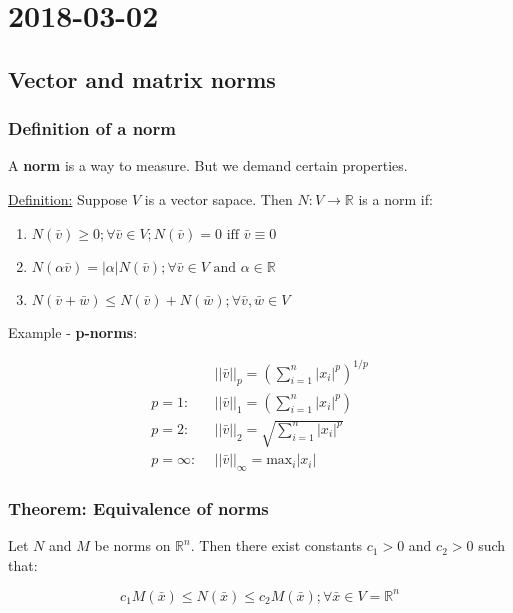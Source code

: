 \section{2018-03-02}

\subsection{Vector and matrix norms}

\subsubsection{Definition of a norm}

A \textbf{norm} is a way to measure. But we demand certain properties.

\underline{Definition:} Suppose $V$ is a vector sapace. Then $N: V \rightarrow \mathbb{R}$ is a norm if:

\begin{enumerate}
  \item $N(\bar{v}) \geq 0; \forall \bar{v} \in V; N(\bar{v}) = 0 \text{ iff } \bar{v} \equiv 0$
  \item $N(\alpha \bar{v}) = |\alpha| N(\bar{v}); \forall \bar{v} \in V \text{ and } \alpha \in \mathbb{R}$
  \item $N(\bar{v}+\bar{w}) \leq N(\bar{v}) + N(\bar{w}); \forall \bar{v}, \bar{w} \in V$
\end{enumerate}

Example - \textbf{p-norms}:

\begin{align*}
                  &||\bar{v}||_p      = (\sum_{i=1}^{n} |x_i|^p)^{1/p} \\
  p = 1:\ \       &||\bar{v}||_1      = (\sum_{i=1}^{n} |x_i|^p) \\
  p = 2:\ \       &||\bar{v}||_2      = \sqrt{\sum_{i=1}^{n} |x_i|^p} \\
  p = \infty:\ \  &||\bar{v}||_\infty = \text{max}_i |x_i|
\end{align*}

\subsubsection{Theorem: Equivalence of norms}

Let $N$ and $M$ be norms on $\mathbb{R}^n$. Then there exist constants $c_1 > 0$ and $c_2 > 0$ such that:

\begin{equation}
  c_1 M(\bar{x}) \leq N(\bar{x}) \leq c_2 M(\bar{x}); \forall \bar{x} \in V = \mathbb{R}^n
\end{equation}

